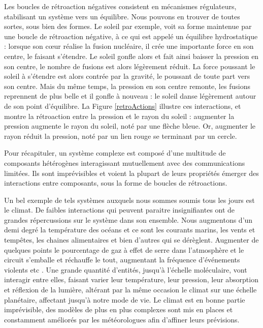 		Les boucles de rétroaction négatives consistent en mécanismes régulateurs, stabilisant un système vers un équilibre. Nous pouvons en trouver de toutes sortes, sous bien des formes. Le soleil par exemple, voit sa forme maintenue par une boucle de rétroaction négative, à ce qui est appelé un équilibre hydrostatique \cite{haubold_analytic_1992} : lorsque son cœur réalise la fusion nucléaire, il crée une importante force en son centre, le faisant s'étendre. Le soleil gonfle alors et fait ainsi baisser la pression en son centre, le nombre de fusions est alors légèrement réduit. La force poussant le soleil à s'étendre est alors contrée par la gravité, le poussant de toute part vers son centre. Mais du même temps, la pression en son centre remonte, les fusions reprennent de plus belle et il gonfle à nouveau : le soleil danse légèrement autour de son point d'équilibre. La Figure \ref{retroActions} illustre ces interactions, et montre la rétroaction entre la pression et le rayon du soleil : augmenter la pression augmente le rayon du soleil, noté par une flèche bleue. Or, augmenter le rayon réduit la pression, noté par un lien rouge se terminant par un cercle.
			
			Pour récapituler, un système complexe est composé d'une multitude de composants hétérogènes interagissant mutuellement avec des communications limitées. Ils sont imprévisibles et voient la plupart de leurs propriétés émerger des interactions entre composants, sous la forme de boucles de rétroactions.
			
			Un bel exemple de tels systèmes auxquels nous sommes soumis tous les jours est le climat. De faibles interactions qui peuvent paraitre insignifiantes ont de grandes répercussions sur le système dans son ensemble. Nous augmentons d'un demi degré la température des océans et ce sont les courants marins, les vents et tempêtes, les chaines alimentaires et bien d'autres qui se dérèglent. Augmenter de quelques points le pourcentage de gaz à effet de serre dans l'atmosphère et le circuit s'emballe et réchauffe le tout, augmentant la fréquence d'événements violents etc \cite{allen_2018_2018}. Une grande quantité d'entités, jusqu'à l'échelle moléculaire, vont interagir entre elles, faisant varier leur température, leur pression, leur absorption et réflexion de la lumière, altérant par la même occasion le climat sur une échelle planétaire, affectant jusqu'à notre mode de vie. Le climat est en bonne partie imprévisible, des modèles de plus en plus complexes sont mis en places et constamment améliorés par les météorologues afin d'affiner leurs prévisions.
						

